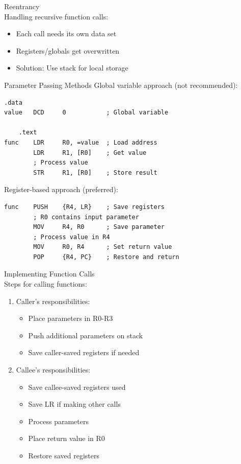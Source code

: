 \begin{concept}{Reentrancy}\\
Handling recursive function calls:
\begin{itemize}
  \item Each call needs its own data set
  \item Registers/globals get overwritten
  \item Solution: Use stack for local storage
\end{itemize}
\end{concept}

\begin{example2}{Parameter Passing Methods}
Global variable approach (not recommended):
\begin{lstlisting}[language=armasm, style=basesmol]
    .data
value   DCD     0           ; Global variable

    .text
func    LDR     R0, =value  ; Load address
        LDR     R1, [R0]    ; Get value
        ; Process value
        STR     R1, [R0]    ; Store result
\end{lstlisting}

Register-based approach (preferred):
\begin{lstlisting}[language=armasm, style=basesmol]
func    PUSH    {R4, LR}    ; Save registers
        ; R0 contains input parameter
        MOV     R4, R0      ; Save parameter
        ; Process value in R4
        MOV     R0, R4      ; Set return value
        POP     {R4, PC}    ; Restore and return
\end{lstlisting}
\end{example2}

\begin{KR}{Implementing Function Calls}\\
Steps for calling functions:
\begin{enumerate}
  \item Caller's responsibilities:
    \begin{itemize}
      \item Place parameters in R0-R3
      \item Push additional parameters on stack
      \item Save caller-saved registers if needed
    \end{itemize}
  \item Callee's responsibilities:
    \begin{itemize}
      \item Save callee-saved registers used
      \item Save LR if making other calls
      \item Process parameters
      \item Place return value in R0
      \item Restore saved registers
    \end{itemize}
\end{enumerate}
\end{KR}

